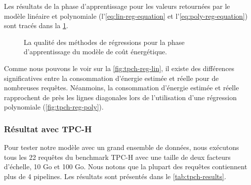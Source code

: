 Les résultats de la phase d'apprentissage pour les valeurs retournées par le modèle linéaire et polynomiale (l'\ref{eq:lin-reg-equation} et l'\ref{eq:poly-reg-equation}) sont tracés dans la \ref{fig:tpch-reg}.

\begin{figure}
  \centering
  \quad
  \caption{La qualité des méthodes de régressions pour la phase d'apprentissage du modèle de coût énergétique.}\label{fig:tpch-reg}
\end{figure}

Comme nous pouvons le voir sur la \ref{fig:tpch-reg-lin}, il existe des différences significatives entre la consommation d'énergie estimée et réelle pour de nombreuses requêtes. Néanmoins, la consommation d'énergie estimée et réelle rapprochent de près les lignes diagonales lors de l'utilisation d'une régression polynomiale (\ref{fig:tpch-reg-poly}).

\subsubsection{Résultat avec TPC-H}
Pour tester notre modèle avec un grand ensemble de données, nous exécutons tous les 22 requêtes du benchmark TPC-H avec une taille de deux facteurs d'échelle, 10 Go et 100 Go. Nous notons que la plupart des requêtes contiennent plus de 4 pipelines.
Les résultats sont présentés dans le \ref{tab:tpch-results}.

